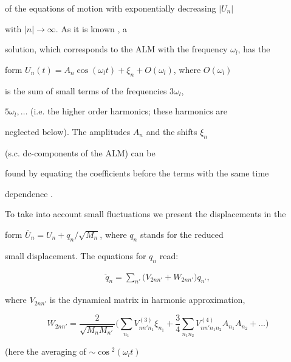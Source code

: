 of the equations of motion with exponentially decreasing $|U_n|$ 

with $|n| \rightarrow \infty$. As it is known \cite{sivtak,page}, a

solution, which corresponds to the ALM with the frequency  $\omega_l$, has the 

form $U_n(t)= A_n \cos(\omega_l t) + \xi_n + O(\omega_l)$, where $O(\omega_l)$ 

is the sum of small terms of the frequencies $3\omega_l$,  

$5\omega_l, \ldots$ (i.e. the higher order harmonics; these harmonics are 

neglected below). The amplitudes $A_{n}$ and the shifts $\xi_{n}$ 

(s.c. dc-components of the ALM) can be 

found by equating the coefficients before the terms with the same time 

dependence \cite{sivtak,page,flach}. 



To take into account small fluctuations we present the displacements in the  

form $\bar{U}_n = U_n + q_n/ \sqrt{M_n}$, where $q_n $ stands for the reduced  

small displacement. The equations for ${q}_{n}$ read: 

\begin{eqnarray}

\ddot{q}_{n}=  

\sum_{n'}{{\big (}V_{2 n n'}+W_{2 n n'}{\big )}{q}_{n'}},

\label{eq:b}

\end{eqnarray}

where $V_{2 n n'}$ is the dynamical matrix in harmonic approximation, 

\begin{equation}

W_{2 n n'} = \frac{2}{\sqrt{M_{n} M_{n'}}} {\Big (} 

\sum_{n_{1}} V^{(3)}_{n n' n_{1}}\xi_{n_{1}} + 

\frac{3}{4} \sum_{n_{1} n_{2}} V^{(4)}_{n n'n_{1} n_{2}} 

A_{n_{1}} A_{n_{2}} + \ldots {\Big )} \label{eq:c}

\end{equation}

(here the averaging of $\sim \cos{\!^2\!(\omega_l t)}$

